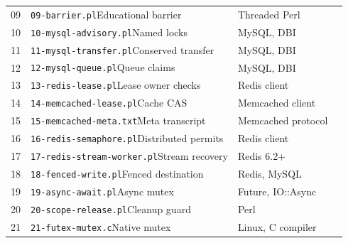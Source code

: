 \begin{longtable}{L{.06\linewidth}L{.41\linewidth}L{.31\linewidth}L{.08\linewidth}}
09 & \nolinkurl{09-barrier.pl}\newline Educational barrier & Threaded Perl & \pageref{listing:examples/09-barrier.pl}\\
10 & \nolinkurl{10-mysql-advisory.pl}\newline Named locks & MySQL, DBI & \pageref{listing:examples/10-mysql-advisory.pl}\\
11 & \nolinkurl{11-mysql-transfer.pl}\newline Conserved transfer & MySQL, DBI & \pageref{listing:examples/11-mysql-transfer.pl}\\
12 & \nolinkurl{12-mysql-queue.pl}\newline Queue claims & MySQL, DBI & \pageref{listing:examples/12-mysql-queue.pl}\\
13 & \nolinkurl{13-redis-lease.pl}\newline Lease owner checks & Redis client & \pageref{listing:examples/13-redis-lease.pl}\\
14 & \nolinkurl{14-memcached-lease.pl}\newline Cache CAS & Memcached client & \pageref{listing:examples/14-memcached-lease.pl}\\
15 & \nolinkurl{15-memcached-meta.txt}\newline Meta transcript & Memcached protocol & \pageref{listing:examples/15-memcached-meta.txt}\\
16 & \nolinkurl{16-redis-semaphore.pl}\newline Distributed permits & Redis client & \pageref{listing:examples/16-redis-semaphore.pl}\\
17 & \nolinkurl{17-redis-stream-worker.pl}\newline Stream recovery & Redis 6.2+ & \pageref{listing:examples/17-redis-stream-worker.pl}\\
18 & \nolinkurl{18-fenced-write.pl}\newline Fenced destination & Redis, MySQL & \pageref{listing:examples/18-fenced-write.pl}\\
19 & \nolinkurl{19-async-await.pl}\newline Async mutex & Future, IO::Async & \pageref{listing:examples/19-async-await.pl}\\
20 & \nolinkurl{20-scope-release.pl}\newline Cleanup guard & Perl & \pageref{listing:examples/20-scope-release.pl}\\
21 & \nolinkurl{21-futex-mutex.c}\newline Native mutex & Linux, C compiler & \pageref{listing:examples/21-futex-mutex.c}\\

\end{longtable}
